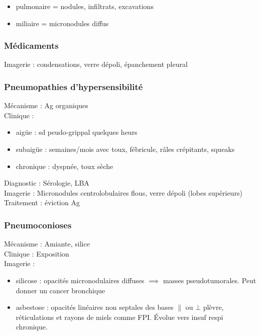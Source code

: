 \documentclass{book}
\begin{document}
\begin{itemize}
\item pulmonaire = nodules, infiltrats, excavations
\item miliaire = micronodules diffus
\end{itemize}


\subsubsection{Médicaments}
\label{sec:orga4efaff}
Imagerie : condensations, verre dépoli, épanchement pleural

\subsubsection{Pneumopathies d'hypersensibilité}
\label{sec:orgf053e05}
Mécanisme : Ag organiques\\
Clinique : 

\begin{itemize}
\item aigüe : sd peudo-grippal quelques heurs
\item subaigüe : semaines/mois avec toux, fébricule, râles crépitants, squeaks
\item chronique : dyspnée, toux sèche
\end{itemize}

Diagnostic : Sérologie, LBA\\
Imagerie : Micronodules centrolobulaires flous, verre dépoli (lobes supérieurs)\\
Traitement : éviction Ag

\subsubsection{Pneumoconioses}
\label{sec:org51c91a8}
Mécanisme : Amiante, silice\\
Clinique : Exposition\\
Imagerie : 

\begin{itemize}
\item silicose : opacités micronodulaires diffuses \(\implies\) masses pseudotumorales. Peut donner un cancer bronchique
\item asbestose : opacités linéaires non septales des bases \(\parallel\) ou \(\bot\) plèvre, réticulations et rayons de miels comme FPI. Évolue vers insuf respi chronique.
\end{itemize}
\end{document}
